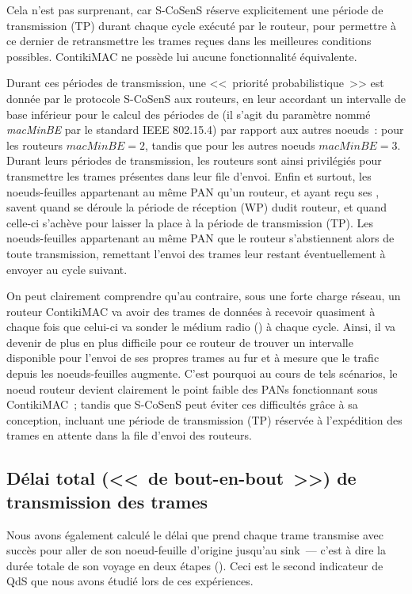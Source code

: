 Cela n'est pas surprenant, car S-CoSenS réserve explicitement une période
de transmission (TP) durant chaque cycle exécuté par le routeur, pour
permettre à ce dernier de retransmettre les trames reçues dans les
meilleures conditions possibles. ContikiMAC ne possède lui aucune
fonctionnalité équivalente.

Durant ces périodes de transmission, une <<~priorité probabilistique~>>
est donnée par le protocole S-CoSenS aux routeurs, en leur accordant un
intervalle de base inférieur pour le calcul des périodes de 
(il s'agit du paramètre nommé \emph{macMinBE} par le standard IEEE 802.15.4)
par rapport aux autres noeuds~: pour les routeurs $macMinBE = 2$, tandis que
pour les autres noeuds $macMinBE = 3$. Durant leurs périodes de transmission,
les routeurs sont ainsi privilégiés pour transmettre les trames présentes
dans leur file d'envoi.
Enfin et surtout, les noeuds-feuilles appartenant au même PAN qu'un routeur,
et ayant reçu ses , savent quand se déroule la période de
réception (WP) dudit routeur, et quand celle-ci s'achève pour laisser
la place à la période de transmission (TP). Les noeuds-feuilles appartenant
au même PAN que le routeur s'abstiennent alors de toute transmission,
remettant l'envoi des trames leur restant éventuellement à envoyer
au cycle suivant.

On peut clairement comprendre qu'au contraire, sous une forte charge
réseau, un routeur ContikiMAC va avoir des trames de données à recevoir
quasiment à chaque fois que celui-ci va sonder le médium radio
() à chaque cycle. Ainsi, il va devenir de plus
en plus difficile pour ce routeur de trouver un intervalle disponible pour
l'envoi de ses propres trames au fur et à mesure que le trafic depuis les
noeuds-feuilles augmente. C'est pourquoi au cours de tels scénarios, le
noeud routeur devient clairement le point faible des PANs fonctionnant
sous ContikiMAC~; tandis que S-CoSenS peut éviter ces difficultés grâce
à sa conception, incluant une période de transmission (TP) réservée
à l'expédition des trames en attente dans la file d'envoi des routeurs.


\subsection{Délai total (<<~de bout-en-bout~>>) de transmission
            des trames}
\label{SubsecDelaiTransm}

Nous avons également calculé le délai que prend chaque trame transmise
avec succès pour aller de son noeud-feuille d'origine jusqu'au sink~---
c'est à dire la durée totale de son voyage en deux étapes
(). Ceci est le second indicateur de QdS
que nous avons étudié lors de ces expériences.

